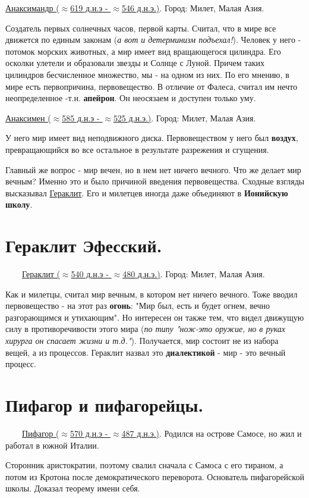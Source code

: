 \documentclass[12pt,a4paper]{article}
\begin{document}
\underline{Анаксимандр ($\approx$619 д.н.э - $\approx$546 д.н.э.)}. Город: Милет, Малая Азия.

Создатель первых солнечных часов, первой карты.
Считал, что в мире все движется по единым законам (\textit{а вот и детерминизм подъехал!}). Человек у него - потомок морских животных, а мир имеет вид вращающегося цилиндра. Его осколки улетели и образовали звезды и Солнце с Луной. Причем таких цилиндров бесчисленное множество, мы - на одном из них.
По его мнению, в мире есть первопричина, первовещество. В отличие от Фалеса, считал им нечто неопределенное -т.н. \textbf{апейрон}. Он неосязаем и доступен только уму.

\underline{Анаксимен ($\approx$585 д.н.э - $\approx$525 д.н.э.)}. Город: Милет, Малая Азия.

У него мир имеет вид неподвижного диска. 
Первовеществом у него был \textbf{воздух}, превращающийся во все остальное в результате разрежения и сгущения.

Главный же вопрос - мир вечен, но в нем нет ничего вечного. Что же делает мир вечным? Именно это и было причиной введения первовещества. Сходные взгляды высказывал \underline{Гераклит}. Его и милетцев иногда даже объединяют в \textbf{Ионийскую школу}.

\section{Гераклит Эфесский.}
\ \ \ \
\underline{Гераклит ($\approx$540 д.н.э - $\approx$480 д.н.э.)}. Город: Милет, Малая Азия.

Как и милетцы, считал мир вечным, в котором нет ничего вечного. Тоже вводил первовещество - на этот раз \textbf{огонь}: "Мир был, есть и будет огнем, вечно разгорающимся и утихающим". Но интересен он также тем, что видел движущую силу в противоречивости этого мира (\textit{по типу "нож-это оружие, но в руках хирурга он спасает жизни и т.д."}). Получается, мир состоит не из набора вещей, а из процессов. Гераклит назвал это \textbf{диалектикой} - мир - это вечный процесс. 

\section{Пифагор и пифагорейцы.}
\ \ \ \
\underline{Пифагор ($\approx$570 д.н.э - $\approx$487 д.н.э.)}. Родился на острове Самосе, но жил и работал в южной Италии.

Сторонник аристократии, поэтому свалил сначала с Самоса с его тираном, а потом из Кротона после демократического переворота.
Основатель пифагорейской школы. Доказал теорему имени себя.
\end{document}
